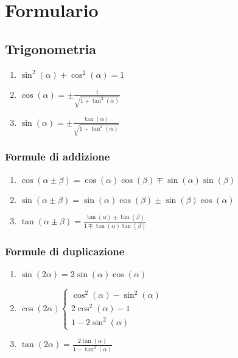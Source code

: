 \section{Formulario}
    \subsection{Trigonometria}\label{Trigonometria}
        \begin{enumerate}
            \item {
                $\sin^2(\alpha) + \cos^2(\alpha) = 1$
            }
            \item {
                $\cos(\alpha)=\pm\frac{1}{\sqrt{1+\tan^2(\alpha)}}$
            }
            \item {
                $\sin(\alpha)=\pm\frac{\tan(\alpha)}{\sqrt{1+\tan^2(\alpha)}}$
            }
        \end{enumerate}
        \subsubsection{Formule di addizione}\label{Trigonometria_Addizione}
            \begin{enumerate}
                \item {
                    $\cos(\alpha \pm \beta) = \cos(\alpha)\cos(\beta) \mp \sin(\alpha)\sin(\beta)$
                }
                \item {
                    $\sin(\alpha \pm \beta) = \sin(\alpha)\cos(\beta) \pm \sin(\beta)\cos(\alpha)$
                }
                \item {
                    $\tan(\alpha \pm \beta) = \frac{\tan(\alpha) \pm \tan(\beta)}{1 \mp \tan(\alpha)\tan(\beta)} $
                }
            \end{enumerate}
        \subsubsection{Formule di duplicazione}\label{Trigonometria_Duplicazione}
            \begin{enumerate}
                \item {
                    $\sin(2\alpha) =2\sin(\alpha)\cos(\alpha)$ 
                }
                \item {
                    $
                        \cos(2\alpha)
                        \begin{cases}
                            \cos^2(\alpha) - \sin^2(\alpha) \\
                            2\cos^2(\alpha)-1\\
                            1-2\sin^2(\alpha)
                        \end{cases}
                    $
                }
                \item {
                    $\tan(2\alpha) =\frac{2\tan(\alpha)}{1-\tan^2(\alpha)}$ 
                }
            \end{enumerate}
